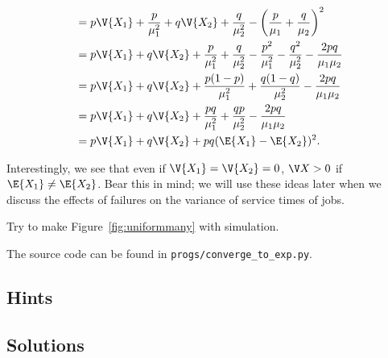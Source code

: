 \begin{question}
\begin{solution}
\begin{equation*}
\begin{split}
&= p \V{X_1} + \frac{p}{\mu_1^2} + q \V{X_2} + \frac{q}{\mu_2^2} - \left(\frac{p}{\mu_1}+\frac{q}{\mu_2}\right)^2 \\ 
&= p \V{X_1} + q \V{X_2}
+ \frac{p}{\mu_1^2} + \frac{q}{\mu_2^2}
- \frac{p^2}{\mu_1^2}-\frac{q^2}{\mu_2^2}  -\frac{2pq}{\mu_1\mu_2}\\ 
&= p \V{X_1} + q \V{X_2}
+ \frac{p(1-p)}{\mu_1^2} + \frac{q(1-q)}{\mu_2^2}
-\frac{2pq}{\mu_1\mu_2}\\ 
&= p \V{X_1} + q \V{X_2}
+ \frac{pq}{\mu_1^2} + \frac{qp}{\mu_2^2}
-\frac{2pq}{\mu_1\mu_2}\\ 
&= p \V{X_1} + q \V{X_2}
+ pq(\E{X_1} - \E{X_2})^2.
\end{split}
\end{equation*}

Interestingly, we see that even if $\V{X_1} = \V{X_2} = 0$, $\V X > 0$
if $\E{X_1} \neq \E{X_2}$. Bear this in mind; we will use these ideas
later when we discuss the effects of failures on the variance of
service times of jobs.

\end{solution}
\end{question}

\begin{question}
  Try to make Figure~\ref{fig:uniformmany} with simulation.
  \begin{solution}
    The source code can be found in \texttt{progs/converge\_to\_exp.py}.
\end{solution}
\end{question}

\subsection*{Hints}

\subsection*{Solutions}

  



